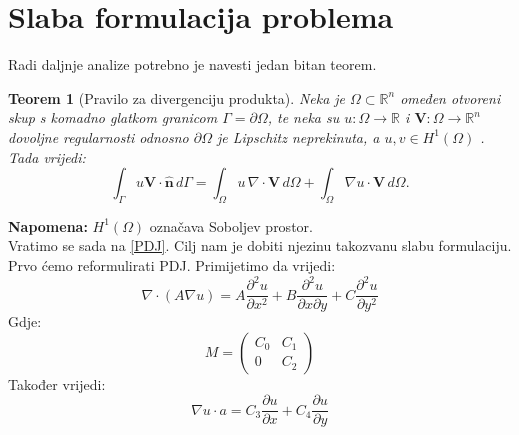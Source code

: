 \documentclass[zavrsnirad]{../fer}
\newtheorem{teorem}{Teorem}
\begin{document}
\section{Slaba formulacija problema}
\label{slabaFormulacija}
Radi daljnje analize potrebno je navesti jedan bitan 
teorem.
\\ 
\begin{teorem}[Pravilo za divergenciju produkta]
\label{tm1}
Neka je $\Omega \subset \mathbb{R}^n$ omeđen otvoreni
skup s komadno glatkom granicom $\Gamma = \partial \Omega$,
te neka su $u : \Omega \to \mathbb{R}$ i $\mathbf{V} : \Omega \to \mathbb{R}^n$ 
dovoljne regularnosti odnosno $\partial \Omega$ je
Lipschitz neprekinuta, a $u,v \in H^1(\Omega)$
. Tada vrijedi:
\[
\int_{\Gamma} u \mathbf{V} \cdot \hat{\mathbf{n}} \, d\Gamma = 
\int_{\Omega} u \, \nabla \cdot \mathbf{V} \, d\Omega + 
\int_{\Omega} \nabla u \cdot \mathbf{V} \, d\Omega.
\]
\end{teorem}
\textbf{Napomena:} $H^1(\Omega)$ označava Soboljev prostor.
\bigskip
\\ 
Vratimo se sada na \ref{PDJ}.
Cilj nam je dobiti njezinu takozvanu slabu formulaciju.
Prvo ćemo reformulirati PDJ. Primijetimo da vrijedi:
$$\nabla \cdot (A \nabla u) = 
  A \frac{\partial^2 u}{\partial x^2}
	+ B \frac{\partial^2 u}{\partial x \partial y}
	+ C \frac{\partial^2 u}{\partial y^2}
$$
Gdje:
$$M = 
\begin{pmatrix}
  C_0 & C_1 \\ 
  0 & C_2
\end{pmatrix}
 $$
 Također vrijedi:
 $$ \nabla u \cdot a =
 C_3 \frac{\partial u}{\partial x}
	+ C_4 \frac{\partial u}{\partial y} $$
\end{document}
